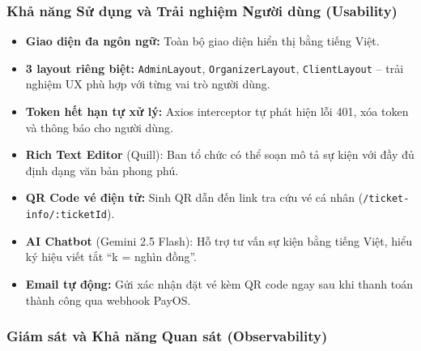 \subsubsection{Khả năng Sử dụng và Trải nghiệm Người dùng (Usability)}

\begin{itemize}[leftmargin=*, label={--}]
    \item \textbf{Giao diện đa ngôn ngữ:} Toàn bộ giao diện hiển thị bằng
    tiếng Việt.

    \item \textbf{3 layout riêng biệt:} \texttt{AdminLayout},
    \texttt{OrganizerLayout}, \texttt{ClientLayout} -- trải nghiệm UX phù
    hợp với từng vai trò người dùng.

    \item \textbf{Token hết hạn tự xử lý:} Axios interceptor tự phát hiện
    lỗi 401, xóa token và thông báo cho người dùng.

    \item \textbf{Rich Text Editor} (Quill): Ban tổ chức có thể soạn mô tả
    sự kiện với đầy đủ định dạng văn bản phong phú.

    \item \textbf{QR Code vé điện tử:} Sinh QR dẫn đến link tra cứu vé cá
    nhân (\texttt{/ticket-info/:ticketId}).

    \item \textbf{AI Chatbot} (Gemini 2.5 Flash): Hỗ trợ tư vấn sự kiện
    bằng tiếng Việt, hiểu ký hiệu viết tắt ``k = nghìn đồng''.

    \item \textbf{Email tự động:} Gửi xác nhận đặt vé kèm QR code ngay
    sau khi thanh toán thành công qua webhook PayOS.
\end{itemize}

\subsubsection{Giám sát và Khả năng Quan sát (Observability)}

